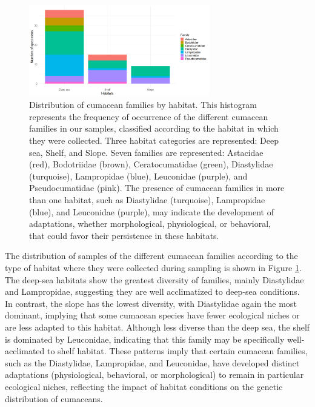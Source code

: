 \begin{figure}[]
    \centering
    \includegraphics[width=0.7\textwidth]{figure4.png}
    \caption{Distribution of cumacean families by habitat. This histogram represents the frequency of occurrence of the different cumacean families in our samples, classified according to the habitat in which they were collected. Three habitat categories are represented: Deep sea, Shelf, and Slope. Seven families are represented: Astacidae (red), Bodotriidae (brown), Ceratocumatidae (green), Diastylidae (turquoise), Lampropidae (blue), Leuconidae (purple), and Pseudocumatidae (pink). The presence of cumacean families in more than one habitat, such as Diastylidae (turquoise), Lampropidae (blue), and Leuconidae (purple), may indicate the development of adaptations, whether morphological, physiological, or behavioral, that could favor their persistence in these habitats. \label{fig:fig5}}
\end{figure}

The distribution of samples of the different cumacean families according to the type of habitat where they were collected during sampling is shown in Figure \ref{fig:fig5}. The deep-sea habitats show the greatest diversity of families, mainly Diastylidae and Lampropidae, suggesting they are well acclimatized to deep-sea conditions. In contrast, the slope has the lowest diversity, with Diastylidae again the most dominant, implying that some cumacean species have fewer ecological niches or are less adapted to this habitat. Although less diverse than the deep sea, the shelf is dominated by Leuconidae, indicating that this family may be specifically well-acclimated to shelf habitat. These patterns imply that certain cumacean families, such as the Diastylidae, Lampropidae, and Leuconidae, have developed distinct adaptations (physiological, behavioral, or morphological) to remain in particular ecological niches, reflecting the impact of habitat conditions on the genetic distribution of cumaceans.

